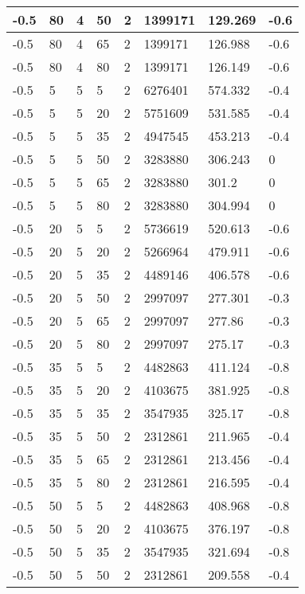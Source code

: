 \begin{longtable}{|p{1.4cm}|p{1.4cm}|p{1.4cm}|p{1.4cm}|p{1.4cm}|p{1.4cm}|p{1.4cm}|p{1.5cm}|}
        -0.5 & 80 & 4 & 50 & 2 & 1399171 & 129.269 & -0.6 \\ \hline
        -0.5 & 80 & 4 & 65 & 2 & 1399171 & 126.988 & -0.6 \\ \hline
        -0.5 & 80 & 4 & 80 & 2 & 1399171 & 126.149 & -0.6 \\ \hline
        -0.5 & 5 & 5 & 5 & 2 & 6276401 & 574.332 & -0.4 \\ \hline
        -0.5 & 5 & 5 & 20 & 2 & 5751609 & 531.585 & -0.4 \\ \hline
        -0.5 & 5 & 5 & 35 & 2 & 4947545 & 453.213 & -0.4 \\ \hline
        -0.5 & 5 & 5 & 50 & 2 & 3283880 & 306.243 & 0 \\ \hline
        -0.5 & 5 & 5 & 65 & 2 & 3283880 & 301.2 & 0 \\ \hline
        -0.5 & 5 & 5 & 80 & 2 & 3283880 & 304.994 & 0 \\ \hline
        -0.5 & 20 & 5 & 5 & 2 & 5736619 & 520.613 & -0.6 \\ \hline
        -0.5 & 20 & 5 & 20 & 2 & 5266964 & 479.911 & -0.6 \\ \hline
        -0.5 & 20 & 5 & 35 & 2 & 4489146 & 406.578 & -0.6 \\ \hline
        -0.5 & 20 & 5 & 50 & 2 & 2997097 & 277.301 & -0.3 \\ \hline
        -0.5 & 20 & 5 & 65 & 2 & 2997097 & 277.86 & -0.3 \\ \hline
        -0.5 & 20 & 5 & 80 & 2 & 2997097 & 275.17 & -0.3 \\ \hline
        -0.5 & 35 & 5 & 5 & 2 & 4482863 & 411.124 & -0.8 \\ \hline
        -0.5 & 35 & 5 & 20 & 2 & 4103675 & 381.925 & -0.8 \\ \hline
        -0.5 & 35 & 5 & 35 & 2 & 3547935 & 325.17 & -0.8 \\ \hline
        -0.5 & 35 & 5 & 50 & 2 & 2312861 & 211.965 & -0.4 \\ \hline
        -0.5 & 35 & 5 & 65 & 2 & 2312861 & 213.456 & -0.4 \\ \hline
        -0.5 & 35 & 5 & 80 & 2 & 2312861 & 216.595 & -0.4 \\ \hline
        -0.5 & 50 & 5 & 5 & 2 & 4482863 & 408.968 & -0.8 \\ \hline
        -0.5 & 50 & 5 & 20 & 2 & 4103675 & 376.197 & -0.8 \\ \hline
        -0.5 & 50 & 5 & 35 & 2 & 3547935 & 321.694 & -0.8 \\ \hline
        -0.5 & 50 & 5 & 50 & 2 & 2312861 & 209.558 & -0.4 \\ \hline

\end{longtable}
